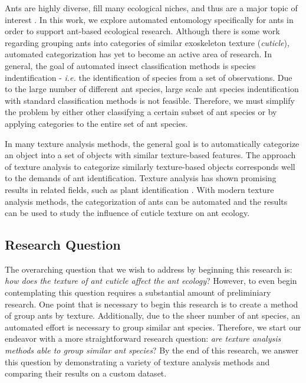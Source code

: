 \documentclass[12pt]{article}
\begin{document}
Ants are highly diverse, fill many ecological niches, and thus are a major topic
of interest \cite{sosiak_multidimensional_2021}. In this work, we explore
automated entomology specifically for ants in order to support ant-based
ecological research. Although there is some work regarding grouping ants into
categories of similar exoskeleton texture (\textit{cuticle}), automated
categorization has yet to become an active area of research. In general, the
goal of automated insect classification methods is species indentification -
\textit{i.e.} the identification of species from a set of observations. Due to
the large number of different ant species, large scale ant species
indentification with standard classification methods is not feasible. Therefore,
we must simplify the problem by either other classifying a certain subset of ant
species or by applying categories to the entire set of ant species.

In many texture analysis methods, the general goal is to automatically
categorize an object into a set of objects with similar texture-based features.
The approach of texture analysis to categorize similarly texture-based objects
corresponds well to the demands of ant identification. Texture analysis has
shown promising results in related fields, such as plant identification
\cite{boudra_plant_2018}. With modern texture analysis methods, the
categorization of ants can be automated and the results can be used to study the
influence of cuticle texture on ant ecology.

\subsection{Research Question}

The overarching question that we wish to address by beginning this research is:
\textit{how does the texture of ant cuticle affect the ant ecology}? However, to
even begin contemplating this question requires a substantial amount of
preliminiary research. One point that is necessary to begin this research is to
create a method of group ants by texture. Additionally, due to the sheer number
of ant species, an automated effort is necessary to group similar ant species.
Therefore, we start our endeavor with a more straightforward research question:
\textit{are texture analysis methods able to group similar ant species}? By the
end of this research, we answer this question by demonstrating a variety of
texture analysis methods and comparing their results on a custom dataset.
\end{document}
